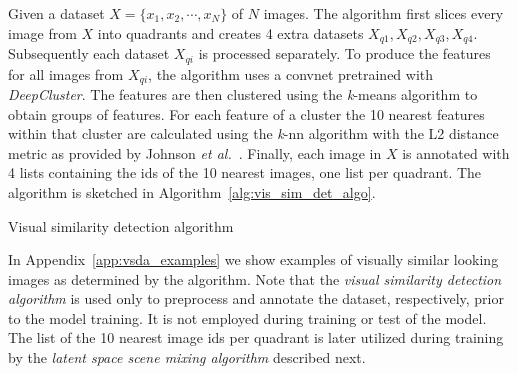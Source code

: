 \documentclass[a4paper,12pt]{report}
\begin{document}
Given a dataset $X = \{x_1,x_2,\cdots,x_N\}$ of $N$ images. The algorithm first slices every image from $X$ into quadrants and creates 4 extra datasets $X_{q1}, X_{q2}, X_{q3}, X_{q4}$. Subsequently each dataset $X_{qi}$ is processed separately. To produce the features for all images from $X_{qi}$, the algorithm uses a convnet pretrained with \textit{DeepCluster}. The features are then clustered using the \textit{k}-means algorithm to obtain groups of features. For each feature of a cluster the 10 nearest features within that cluster are calculated using the \textit{k}-nn algorithm with the L2 distance metric as provided by Johnson \textit{et al.}~\cite{FaissKnn}. Finally, each image in $X$ is annotated with 4 lists containing the ids of the 10 nearest images, one list per quadrant. The algorithm is sketched in Algorithm~\ref{alg:vis_sim_det_algo}.

\begin{algorithm}[H]
\DontPrintSemicolon
\LinesNumbered
{}
\caption{Visual similarity detection algorithm}\label{alg:vis_sim_det_algo}
\end{algorithm}

In Appendix~\ref{app:vsda_examples} we show examples of visually similar looking images as determined by the algorithm. Note that the \textit{visual similarity detection algorithm} is used only to preprocess and annotate the dataset, respectively, prior to the model training. It is not employed during training or test of the model. The list of the 10 nearest image ids per quadrant is later utilized during training by the \textit{latent space scene mixing algorithm} described next.
\end{document}
